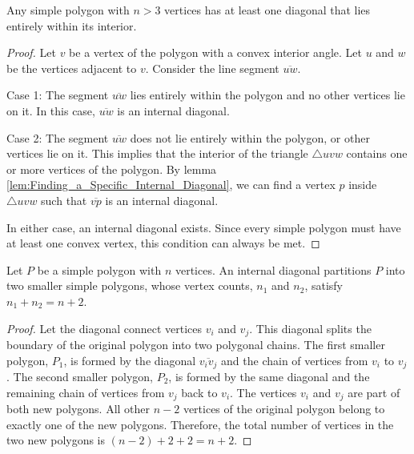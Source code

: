 \begin{lemma}
    \label{lem:Existence_of_an_Internal_Diagonal}
    Any simple polygon with $n > 3$ vertices has at least one diagonal that lies entirely within its interior.
\end{lemma}

\begin{proof}
    Let $v$ be a vertex of the polygon with a convex interior angle. Let $u$ and $w$ be the vertices adjacent to $v$. Consider the line segment $\overline{uw}$.
    
    Case 1: The segment $\overline{uw}$ lies entirely within the polygon and no other vertices lie on it. In this case, $\overline{uw}$ is an internal diagonal.
    
    Case 2: The segment $\overline{uw}$ does not lie entirely within the polygon, or other vertices lie on it. This implies that the interior of the triangle $\triangle uvw$ contains one or more vertices of the polygon. By lemma \ref{lem:Finding_a_Specific_Internal_Diagonal}, we can find a vertex $p$ inside $\triangle uvw$ such that $\overline{vp}$ is an internal diagonal.
    
    In either case, an internal diagonal exists. Since every simple polygon must have at least one convex vertex, this condition can always be met.
\end{proof}

\begin{lemma}
    \label{lem:Polygon_Splitting_by_Diagonal}
    Let $P$ be a simple polygon with $n$ vertices. An internal diagonal partitions $P$ into two smaller simple polygons, whose vertex counts, $n_1$ and $n_2$, satisfy $n_1 + n_2 = n+2$.
\end{lemma}
\begin{proof}
    Let the diagonal connect vertices $v_i$ and $v_j$. This diagonal splits the boundary of the original polygon into two polygonal chains. The first smaller polygon, $P_1$, is formed by the diagonal $\overline{v_i v_j}$ and the chain of vertices from $v_i$ to $v_j$. The second smaller polygon, $P_2$, is formed by the same diagonal and the remaining chain of vertices from $v_j$ back to $v_i$. The vertices $v_i$ and $v_j$ are part of both new polygons. All other $n-2$ vertices of the original polygon belong to exactly one of the new polygons. Therefore, the total number of vertices in the two new polygons is $(n-2) + 2 + 2 = n+2$.
\end{proof}


